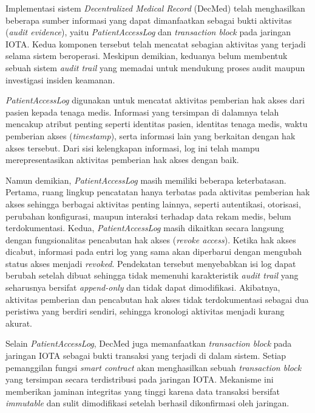 
Implementasi sistem \textit{Decentralized Medical Record} (DecMed) \cite{DecMed} telah menghasilkan beberapa sumber informasi yang dapat dimanfaatkan sebagai bukti aktivitas (\textit{audit evidence}), yaitu \textit{PatientAccessLog} dan \textit{transaction block} pada jaringan IOTA. Kedua komponen tersebut telah mencatat sebagian aktivitas yang terjadi selama sistem beroperasi. Meskipun demikian, keduanya belum membentuk sebuah sistem \textit{audit trail} yang memadai untuk mendukung proses audit maupun investigasi insiden keamanan.

\textit{PatientAccessLog} digunakan untuk mencatat aktivitas pemberian hak akses dari pasien kepada tenaga medis. Informasi yang tersimpan di dalamnya telah mencakup atribut penting seperti identitas pasien, identitas tenaga medis, waktu pemberian akses (\textit{timestamp}), serta informasi lain yang berkaitan dengan hak akses tersebut. Dari sisi kelengkapan informasi, log ini telah mampu merepresentasikan aktivitas pemberian hak akses dengan baik.

Namun demikian, \textit{PatientAccessLog} masih memiliki beberapa keterbatasan. Pertama, ruang lingkup pencatatan hanya terbatas pada aktivitas pemberian hak akses sehingga berbagai aktivitas penting lainnya, seperti autentikasi, otorisasi, perubahan konfigurasi, maupun interaksi terhadap data rekam medis, belum terdokumentasi. Kedua, \textit{PatientAccessLog} masih dikaitkan secara langsung dengan fungsionalitas pencabutan hak akses (\textit{revoke access}). Ketika hak akses dicabut, informasi pada entri log yang sama akan diperbarui dengan mengubah status akses menjadi \textit{revoked}. Pendekatan tersebut menyebabkan isi log dapat berubah setelah dibuat sehingga tidak memenuhi karakteristik \textit{audit trail} yang seharusnya bersifat \textit{append-only} dan tidak dapat dimodifikasi. Akibatnya, aktivitas pemberian dan pencabutan hak akses tidak terdokumentasi sebagai dua peristiwa yang berdiri sendiri, sehingga kronologi aktivitas menjadi kurang akurat.

Selain \textit{PatientAccessLog}, DecMed juga memanfaatkan \textit{transaction block} pada jaringan IOTA sebagai bukti transaksi yang terjadi di dalam sistem. Setiap pemanggilan fungsi \textit{smart contract} akan menghasilkan sebuah \textit{transaction block} yang tersimpan secara terdistribusi pada jaringan IOTA. Mekanisme ini memberikan jaminan integritas yang tinggi karena data transaksi bersifat \textit{immutable} dan sulit dimodifikasi setelah berhasil dikonfirmasi oleh jaringan.

